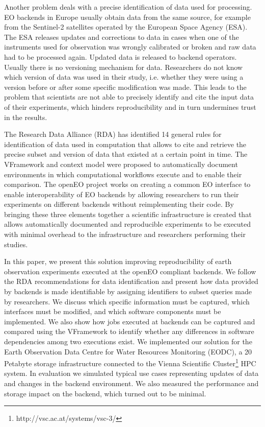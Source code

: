 \documentclass[draft,final]{vutinfth} %
\begin{document}
Another problem deals with a precise identification of data used for processing. EO backends in Europe usually obtain data from the same source, for example from the Sentinel-2 satellites operated by the European Space Agency (ESA). The ESA releases updates and corrections to data in cases when one of the instruments used for observation was wrongly calibrated or broken and raw data had to be processed again. Updated data is released to backend operators. Usually there is no versioning mechanism for data. Researchers do not know which version of data was used in their study, i.e. whether they were using a version before or after some specific modification was made. This leads to the problem that scientists are not able to precisely identify and cite the input data of their experiments, which hinders reproducibility and in turn undermines trust in the  results. 

The Research Data Alliance (RDA) has identified 14 general rules \cite{rauber2016identification} for identification of data used in computation that allows to cite and retrieve the precise subset and version of data that existed at a certain point in time. The VFramework \cite{MiksaBiomedical} and context model \cite{MayerOntology} were proposed to automatically document environments in which computational workflows execute and to enable their comparison. The openEO project \cite{openeo} works on creating a common EO interface to enable interoperability of EO backends by allowing researchers to run their experiments on different backends without reimplementing their code. 
By bringing these three elements together a scientific infrastructure is created that allows automatically documented and reproducible experiments to be executed with minimal overhead to the infrastructure and researchers performing their studies.

In this paper, we present this solution improving reproducibility of earth observation experiments executed at the openEO compliant backends. We follow the RDA recommendations for data identification and present how data provided by backends is made identifiable by assigning identifiers to subset queries made by researchers. We discuss which specific information must be captured, which interfaces must be modified, and which software components must be implemented. We also show how jobs executed at backends can be captured and compared using the VFramework to identify whether any differences in software dependencies among two executions exist. We implemented our solution for the Earth Observation Data Centre for Water Resources Monitoring (EODC), a 20 Petabyte storage infrastructure connected to the Vienna Scientific Cluster\footnote{http://vsc.ac.at/systems/vsc-3/} HPC system. In evaluation we simulated typical use cases representing updates of data and changes in the backend environment. We also measured the performance and storage impact on the backend, which turned out to be minimal. 
\end{document}
